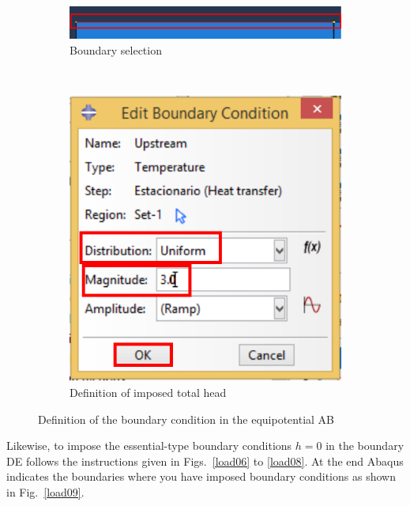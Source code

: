 \begin{figure}[!h]
    \begin{subfigure}[!h]{0.52\textwidth}
      \includegraphics[width=\textwidth]{./body/images/load04.pdf}
      \caption{Boundary selection}
      \label{load04}
    \end{subfigure}%
    ~ %
    \begin{subfigure}[!h]{0.45\textwidth}
      \includegraphics[width=\textwidth]{./body/images/load05.pdf}
      \caption{Definition of imposed total head}
      \label{load05}
    \end{subfigure}%
    \caption{Definition of the boundary condition in the equipotential
      AB}
  \end{figure}

  Likewise, to impose the essential-type boundary conditions $h=0$ in
  the boundary DE follows the instructions given in Figs.~\ref{load06}
  to \ref{load08}. At the end Abaqus indicates the boundaries where
  you have imposed boundary conditions as shown in Fig.~\ref{load09}.

